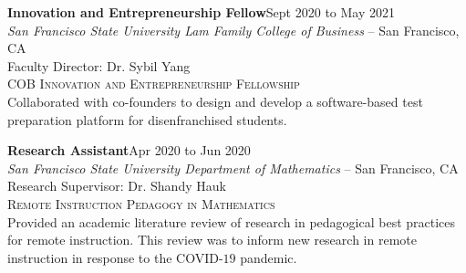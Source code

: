 \documentclass[hidelinks, 10pt]{article}
\begin{document}
{{\vspace{4mm}

\begin{minipage}[ct]{0.9\linewidth}
\textbf{Innovation and Entrepreneurship Fellow}\hfill Sept 2020 to May 2021\\
\emph{San Francisco State University Lam Family College of Business} -- San Francisco, CA\\
Faculty Director: Dr. Sybil Yang\\
{\textsc{COB Innovation and Entrepreneurship Fellowship}}
\vspace{1mm}\\
Collaborated with co-founders to design and develop a software-based test
preparation platform for disenfranchised students.
\end{minipage}

\vspace{4mm}

\begin{minipage}[ct]{0.9\linewidth}
\textbf{Research Assistant}\hfill Apr 2020 to Jun 2020\\
\emph{San Francisco State University Department of Mathematics} -- San Francisco, CA\\
Research Supervisor: Dr. Shandy Hauk\\
{\textsc{Remote Instruction Pedagogy in Mathematics}}
\vspace{1mm}\\
Provided an academic literature review of research in pedagogical best practices
for remote instruction.  This review was to inform new research in remote
instruction in response to the COVID-$19$ pandemic.
\end{minipage}

}}
\end{document}
